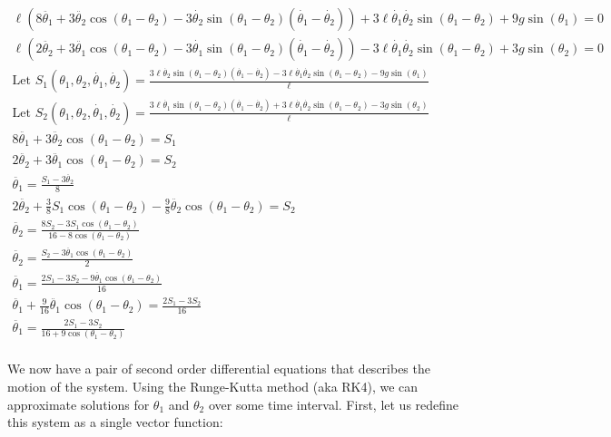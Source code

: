 \documentclass[]{article}
\begin{document}
\begin{gather*}
	\ell(8\ddot{\theta_1} + 3\ddot{\theta_2}\cos(\theta_1 - \theta_2) - 3\dot{\theta_2}\sin(\theta_1 - \theta_2)(\dot{\theta_1} - \dot{\theta_2})) + 3\ell\dot{\theta_1}\dot{\theta_2}\sin(\theta_1 - \theta_2) + 9g\sin(\theta_1) =  0 \\
	\ell(2\ddot{\theta_2} + 3\ddot{\theta_1}\cos(\theta_1 - \theta_2) - 3\dot{\theta_1}\sin(\theta_1 - \theta_2)(\dot{\theta_1} - \dot{\theta_2})) - 3\ell\dot{\theta_1}\dot{\theta_2}\sin(\theta_1 - \theta_2) + 3g\sin(\theta_2) = 0 \\
	\text{Let } S_1(\theta_1, \theta_2, \dot{\theta_1}, \dot{\theta_2}) = \frac{3\ell\dot{\theta_2}\sin(\theta_1 - \theta_2)(\dot{\theta_1} - \dot{\theta_2}) - 3\ell\dot{\theta_1}\dot{\theta_2}\sin(\theta_1 - \theta_2) - 9g\sin(\theta_1)}{\ell} \\
	\text{Let } S_2(\theta_1, \theta_2, \dot{\theta_1}, \dot{\theta_2})  = \frac{3\ell\dot{\theta_1}\sin(\theta_1 - \theta_2)(\dot{\theta_1} - \dot{\theta_2}) + 3\ell\dot{\theta_1}\dot{\theta_2}\sin(\theta_1 - \theta_2) - 3g\sin(\theta_2)}{\ell} \\
	8\ddot{\theta_1} + 3\ddot{\theta_2}\cos(\theta_1 - \theta_2) = S_1 \\
	2\ddot{\theta_2} + 3\ddot{\theta_1}\cos(\theta_1 - \theta_2) = S_2 \\
	\ddot{\theta_1} = \frac{S_1 - 3\ddot{\theta_2}}{8} \\
	2\ddot{\theta_2} + \frac38S_1\cos(\theta_1 - \theta_2) - \frac98\ddot{\theta_2}\cos(\theta_1 - \theta_2) = S_2 \\
	\ddot{\theta_2} = \frac{8S_2 - 3S_1\cos(\theta_1 - \theta_2)}{16 - 8\cos(\theta_1 - \theta_2)} \\
	\ddot{\theta_2} = \frac{S_2 - 3\ddot{\theta_1}\cos(\theta_1 - \theta_2)}{2} \\
	\ddot{\theta_1} = \frac{2S_1 - 3S_2 - 9\ddot{\theta_1}\cos(\theta_1 - \theta_2)}{16} \\
	\ddot{\theta_1} + \frac{9}{16}\ddot{\theta_1}\cos(\theta_1 - \theta_2) = \frac{2S_1 - 3S_2}{16} \\
	\ddot{\theta_1} = \frac{2S_1 - 3S_2}{16 + 9\cos(\theta_1 - \theta_2)} \\
\end{gather*}

We now have a pair of second order differential equations that describes the motion of the system. Using the Runge-Kutta method (aka RK4), we can approximate solutions for $\theta_1$ and $\theta_2$ over some time interval. First, let us redefine this system as a single vector function:
\end{document}
